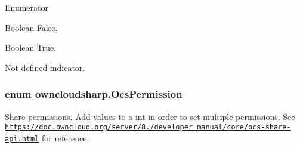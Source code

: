 \begin{Desc}
\item[Enumerator]\par
\begin{description}
\item[{\em 
\hypertarget{namespaceowncloudsharp_a7d494b18f174086318df1bdf916068b5af8320b26d30ab433c5a54546d21f414c}{}False\label{namespaceowncloudsharp_a7d494b18f174086318df1bdf916068b5af8320b26d30ab433c5a54546d21f414c}
}]Boolean False. \item[{\em 
\hypertarget{namespaceowncloudsharp_a7d494b18f174086318df1bdf916068b5af827cf462f62848df37c5e1e94a4da74}{}True\label{namespaceowncloudsharp_a7d494b18f174086318df1bdf916068b5af827cf462f62848df37c5e1e94a4da74}
}]Boolean True. \item[{\em 
\hypertarget{namespaceowncloudsharp_a7d494b18f174086318df1bdf916068b5a6adf97f83acf6453d4a6a4b1070f3754}{}None\label{namespaceowncloudsharp_a7d494b18f174086318df1bdf916068b5a6adf97f83acf6453d4a6a4b1070f3754}
}]Not defined indicator. \end{description}
\end{Desc}
\hypertarget{namespaceowncloudsharp_a86ba7b86b85c7f5be2304a1ef7ae3157}{}
\subsubsection[{Ocs\+Permission}]{\setlength{\rightskip}{0pt plus 5cm}enum {\bf owncloudsharp.\+Ocs\+Permission}\hspace{0.3cm}{\ttfamily [strong]}}\label{namespaceowncloudsharp_a86ba7b86b85c7f5be2304a1ef7ae3157}


Share permissions. Add values to a int in order to set multiple permissions. See {\ttfamily \href{https://doc.owncloud.org/server/8.2/developer_manual/core/ocs-share-api.html}{\tt https\+://doc.\+owncloud.\+org/server/8./developer\+\_\+manual/core/ocs-\/share-\/api.\+html}} for reference. 

